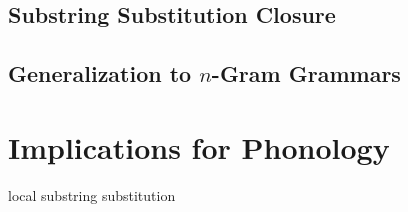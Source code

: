 \subsection{Substring Substitution Closure}

\subsection{\texorpdfstring{Generalization to $n$-Gram Grammars}{Generalization to n-Gram Grammars}}

\section{Implications for Phonology}


local substring substitution

